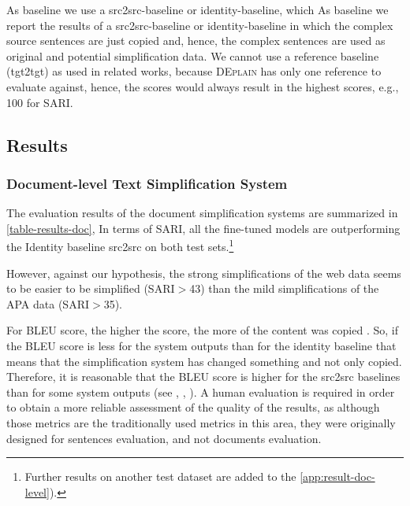 \documentclass[11pt]{article}
\begin{document}
As baseline we use a src2src-baseline or identity-baseline, which 
As baseline we report the results of a src2src-baseline or identity-baseline in which the complex source sentences are just copied and, hence, the complex sentences are used as original and potential simplification data. We cannot use a reference baseline (tgt2tgt) as used in related works, because \textsc{DEplain} has only one reference to evaluate against, hence, the scores would always result in the highest scores, e.g., 100 for SARI. 

\subsection{Results}
\subsubsection{Document-level Text Simplification System}


The evaluation results of the document simplification systems are summarized in \autoref{table-results-doc}, 
In terms of SARI, all the fine-tuned models are outperforming the Identity baseline src2src on both test sets.\footnote{Further results on another test dataset are added to the \autoref{app:result-doc-level}).}

However, against our hypothesis, the strong simplifications of the web data seems to be easier to be simplified (SARI$>$43) than the mild simplifications of the APA data (SARI$>$35). 

For BLEU score, the higher the score, the more of the content was copied \cite{chatterjee-agarwal-2021-depsym}. So, if the BLEU score is less for the system outputs than for the identity baseline that means that the simplification system has changed something and not only copied. Therefore, it is reasonable that the BLEU score is higher for the src2src baselines than for some system outputs (see \citealt{xu-etal-2016-optimizing}, \citet{sulem-etal-2018-simple}, \cite{chatterjee-agarwal-2021-depsym}).
A human evaluation is required in order to obtain a more reliable assessment of the quality of the results, as although those metrics are the traditionally used metrics in this area, they were originally designed for sentences evaluation, and not documents evaluation. 
\end{document}
